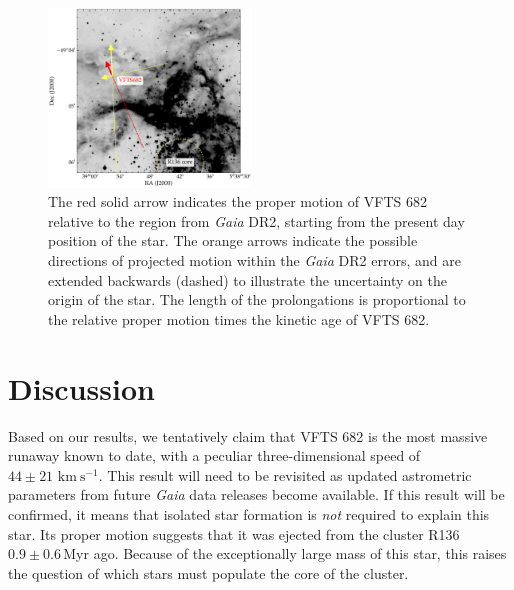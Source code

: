 \documentclass[a4paper,fleqn,usenatbib]{mnras}
\newcommand{\todo}[1]{{\large $\blacksquare$~\textbf{\color{red}[#1]}}~$\blacksquare$}
\newcommand{\kms}{{\,\mathrm{km\ s^{-1}}}}
\begin{document}
\begin{figure}%
  \centering
  \includegraphics[width=0.48\textwidth]{./figures/main_plot_good_gaia_only}  
  \caption{The red solid arrow indicates the proper motion of VFTS 682
    relative to the region from \emph{Gaia} DR2, starting from the present day position of
    the star. The orange arrows indicate the possible
    directions of projected motion within the \emph{Gaia} DR2 errors, and are extended
    backwards (dashed) to illustrate the uncertainty on the origin of the
    star. The length of the prolongations is proportional to the relative proper motion
    times the kinetic age of VFTS 682. %
  }
  
  \label{fig:main}
\end{figure}


\section{Discussion}
\label{sec:discussion}

Based on our results, we tentatively claim that VFTS 682 is the most massive
runaway known to date, with a peculiar three-dimensional speed of
$44\pm21\,\kms$. This result will need to be revisited as updated
astrometric parameters from future \emph{Gaia} data releases become
available. If this result will be confirmed, it means that isolated star formation is
\emph{not} required to explain this star. Its proper motion suggests that it was ejected from the cluster R136
$0.9\pm0.6$\,Myr ago. Because of the exceptionally large mass
of this star, this raises the question of which stars must populate
the core of the cluster.
\end{document}
